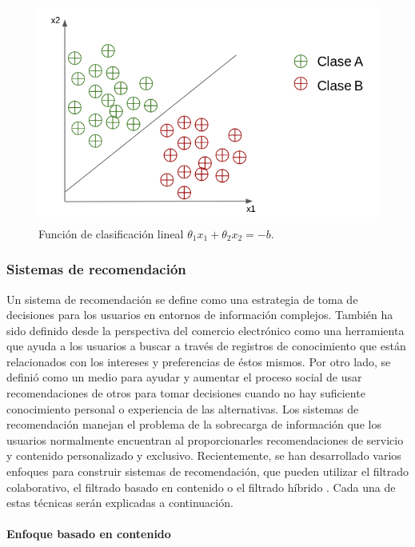 \FloatBarrier
\begin{figure}[htbp!]
		\centering
			\includegraphics[width=.5 \textwidth]{imagenes/perceptron}
		\caption{Función de clasificación lineal ${\theta}_1 x_1 + {\theta}_2 x_2 = -b$.}
		\label{image:perceptonclasificacion}
\end{figure}
\FloatBarrier


\subsubsection{Sistemas de recomendación}

Un sistema de recomendación se define como una estrategia de toma de decisiones para los usuarios en entornos de información complejos. También ha sido definido desde la perspectiva del comercio electrónico como una herramienta que ayuda a los usuarios a buscar a través de registros de conocimiento que están relacionados con los intereses y preferencias de éstos mismos. Por otro lado, se definió como un medio para ayudar y aumentar el proceso social de usar recomendaciones de otros para tomar decisiones cuando no hay suficiente conocimiento personal o experiencia de las alternativas. Los sistemas de recomendación manejan el problema de la sobrecarga de información que los usuarios normalmente encuentran al proporcionarles recomendaciones de servicio y contenido personalizado y exclusivo. Recientemente, se han desarrollado varios enfoques para construir sistemas de recomendación, que pueden utilizar el filtrado colaborativo, el filtrado basado en contenido o el filtrado híbrido \cite{Isinkaye}. Cada una de estas técnicas serán explicadas a continuación.\\

\paragraph{Enfoque basado en contenido} ~\\

